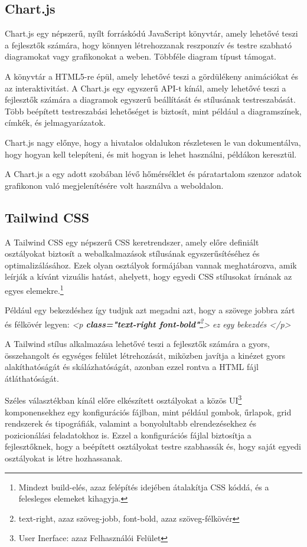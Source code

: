 \documentclass[
]{thesis-ekf}
\theoremstyle{definition}
\theoremstyle{remark}
\begin{document}
	\subsection{Chart.js}
	Chart.js egy népszerű, nyílt forráskódú JavaScript könyvtár, amely lehetővé teszi a fejlesztők számára, hogy könnyen létrehozzanak reszponzív és testre szabható diagramokat vagy grafikonokat a weben. Többféle diagram típust támogat.
	
	A könyvtár a HTML5-re épül, amely lehetővé teszi a gördülékeny animációkat és az interaktivitást. A Chart.js egy egyszerű API-t kínál, amely lehetővé teszi a fejlesztők számára a diagramok egyszerű beállítását és stílusának testreszabását. Több beépített testreszabási lehetőséget is biztosít, mint például a diagramszínek, címkék, és jelmagyarázatok.\cite{chartJS}
	
	Chart.js nagy előnye, hogy a hivatalos oldalukon részletesen le van dokumentálva, hogy hogyan kell telepíteni, és mit hogyan is lehet használni, példákon keresztül.
	
	A Chart.js a egy adott szobában lévő hőmérséklet és páratartalom szenzor adatok grafikonon való megjelenítésére volt használva a weboldalon.
	
	\subsection{Tailwind CSS}\label{tailwind}
	A Tailwind CSS egy népszerű CSS keretrendszer, amely előre definiált osztályokat biztosít a webalkalmazások stílusának egyszerűsítéséhez és optimalizálásához. Ezek olyan osztályok formájában vannak meghatározva, amik leírják a kívánt vizuális hatást, ahelyett, hogy egyedi CSS stílusokat írnának az egyes elemekre.\footnote{Mindezt build-elés, azaz felépítés idejében átalakítja CSS kóddá, és a felesleges elemeket kihagyja.}
	
	Például egy bekezdéshez így tudjuk azt megadni azt, hogy a szövege jobbra zárt és félkövér legyen: \emph{<p \textbf{class="text-right font-bold"}\footnote{text-right, azaz szöveg-jobb, font-bold, azaz szöveg-félkövér}> ez egy bekezdés </p>}
	
	A Tailwind stílus alkalmazása lehetővé teszi a fejlesztők számára a gyors, összehangolt és egységes felület létrehozását, miközben javítja a kinézet gyors alakíthatóságát és skálázhatóságát, azonban ezzel rontva a HTML fájl átláthatóságát.
	
	Széles választékban kínál előre elkészített osztályokat a közös UI\footnote{User Inerface: azaz Felhasználói Felület} komponensekhez egy konfigurációs fájlban, mint például gombok, űrlapok, grid rendszerek és tipográfiák, valamint a bonyolultabb elrendezésekhez és pozicionálási feladatokhoz is. Ezzel a konfigurációs fájlal biztosítja a fejlesztőknek, hogy a beépített osztályokat testre szabhassák és, hogy saját egyedi osztályokat is létre hozhassanak. 
	
\end{document}
